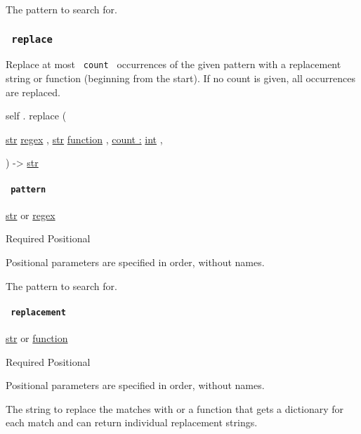 The pattern to search for.

\subsubsection{\texorpdfstring{\texttt{\ replace\ }}{ replace }}\label{definitions-replace}

Replace at most \texttt{\ count\ } occurrences of the given pattern with
a replacement string or function (beginning from the start). If no count
is given, all occurrences are replaced.

self { . } { replace } (

{ \href{/docs/reference/foundations/str/}{str}
\href{/docs/reference/foundations/regex/}{regex} , } {
\href{/docs/reference/foundations/str/}{str}
\href{/docs/reference/foundations/function/}{function} , } {
\hyperref[definitions-replace-parameters-count]{count :}
\href{/docs/reference/foundations/int/}{int} , }

) -\textgreater{} \href{/docs/reference/foundations/str/}{str}

\paragraph{\texorpdfstring{\texttt{\ pattern\ }}{ pattern }}\label{definitions-replace-pattern}

\href{/docs/reference/foundations/str/}{str} {or}
\href{/docs/reference/foundations/regex/}{regex}

{Required} {{ Positional }}

\label{definitions-replace-pattern-positional-tooltip}
Positional parameters are specified in order, without names.

The pattern to search for.

\paragraph{\texorpdfstring{\texttt{\ replacement\ }}{ replacement }}\label{definitions-replace-replacement}

\href{/docs/reference/foundations/str/}{str} {or}
\href{/docs/reference/foundations/function/}{function}

{Required} {{ Positional }}

\label{definitions-replace-replacement-positional-tooltip}
Positional parameters are specified in order, without names.

The string to replace the matches with or a function that gets a
dictionary for each match and can return individual replacement strings.

